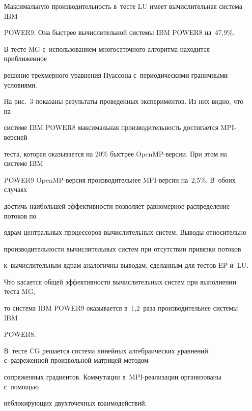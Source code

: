 Максимальную производительность в~тесте LU имеет вычислительная сис\-те\-ма IBM 


\mbox{POWER9}. Она быст\-рее вычислительной сис\-те\-мы IBM \mbox{POWER8} на~47,9\%.











В тесте MG с~использованием многосеточного алгоритма находится приближенное 


решение трехмерного уравнения Пуассона с~периодическими граничными условиями. 


На рис.~3 показаны результаты проведенных экспериментов. Из них видно, что на 


системе IBM POWER8 максимальная производительность достигается MPI-вер\-си\-ей 


тес\-та, которая оказывается на 20\% быстрее OpenMP-вер\-сии. При этом на системе IBM 


\mbox{POWER9} \mbox{OpenMP}-вер\-сия производительнее MPI-вер\-сии на~2,5\%. В~обоих случаях 


достичь наибольшей эффективности позволяет равномерное распределение потоков по 


ядрам центральных процессоров вы\-чис\-ли\-тель\-ных сис\-тем. Выводы относительно 


производительности вычислительных систем при отсутствии привязки потоков 


к~вычислительным ядрам аналогичны выводам, сделанным для тестов EP и~LU.





Что касается общей эффективности вычислительных сис\-тем при выполнении тес\-та MG, 


то система IBM \mbox{POWER9} оказывается в~1,2~раза производительнее системы IBM 


\mbox{POWER8}.








В~тесте CG решается система линейных алгебраических уравнений с~разреженной произвольной матрицей методом 


сопряженных градиентов. Коммутации в~MPI-реа\-ли\-за\-ции организованы с~по\-мощью 


неблокирующих двухточечных взаимодействий. 


